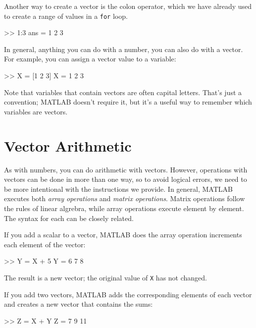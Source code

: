 Another way to create a vector is the colon operator, which we have already used to create a range of values in a \lstinline{for} loop.

\begin{code}
>> 1:3
ans = 1     2     3
\end{code}

In general, anything you can do with a number, you can also do with
a vector.  For example, you can assign a vector value to a variable:

\begin{code}
>> X = [1 2 3]
X = 1     2     3
\end{code}

Note that variables that contain vectors are often capital letters.
That's just a convention; MATLAB doesn't require it, but it's a useful way to remember which variables are vectors.


\section{Vector Arithmetic}
\label{elementwise}


As with numbers, you can do arithmetic with vectors.  However, operations with vectors can be done in more than one way, so to avoid logical errors, we need to be more intentional with the instructions we provide.  In general, MATLAB executes both \emph{array operations} and \emph{matrix operations}.   Matrix operations follow the rules of linear algrebra, while array operations execute element by element.  The syntax for each can be closely related.


If you add a scalar to a vector, MATLAB does the array operation increments each element of the vector:

\begin{code}
>> Y = X + 5
Y = 6     7     8
\end{code}

The result is a new vector; the original value of \lstinline{X} has not
changed.

If you add two vectors, MATLAB adds the corresponding elements of each
vector and creates a new vector that contains the sums:

\begin{code}
>> Z = X + Y
Z = 7     9    11
\end{code}

